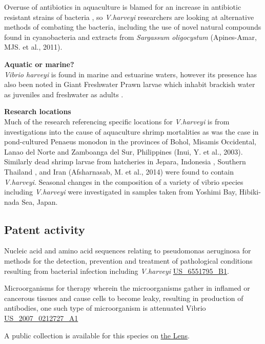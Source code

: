 \documentclass[]{book}
\theoremstyle{definition}
\theoremstyle{definition}
\theoremstyle{definition}
\theoremstyle{remark}
\begin{document}
Overuse of antibiotics in aquaculture is blamed for an increase in
antibiotic resistant strains of bacteria \citep{Elmahdi_2016}, so
\emph{V.harveyi} researchers are looking at alternative methods of
combating the bacteria, including the use of novel natural compounds
found in cyanobacteria \citep{Maneechote_2016} and extracts from
\emph{Sargassum oligocystum} (Apines-Amar, MJS. et al., 2011).

\textbf{Aquatic or marine?}\\
\emph{Vibrio harveyi} is found in marine and estuarine waters, however
its presence has also been noted in Giant Freshwater Prawn larvae which
inhabit brackish water as juveniles and freshwater as adults
\citep{Pande_2013}.

\textbf{Research locations}\\
Much of the research referencing specific locations for \emph{V.harveyi}
is from investigations into the cause of aquaculture shrimp mortalities
as was the case in pond-cultured Penaeus monodon in the provinces of
Bohol, Misamis Occidental, Lanao del Norte and Zamboanga del Sur,
Philippines (Inui, Y. et al., 2003). Similarly dead shrimp larvae from
hatcheries in Jepara, Indonesia \citep{Prayitno_1995}, Southern Thailand
\citep{Ruangpan_1999}, and Iran (Afsharnasab, M. et al., 2014) were
found to contain \emph{V.harveyi}. Seasonal changes in the composition
of a variety of vibrio species including \emph{V.harveyi} were
investigated in samples taken from Yoshimi Bay, Hibiki-nada Sea, Japan.

\hypertarget{patent-activity-8}{%
\subsection{Patent activity}\label{patent-activity-8}}

Nucleic acid and amino acid sequences relating to pseudomonas aeruginosa
for methods for the detection, prevention and treatment of pathological
conditions resulting from bacterial infection including \emph{V.harveyi}
\href{https://www.lens.org/lens/patent/US_6551795_B1}{US\_6551795\_B1}.

Microorganisms for therapy wherein the microorganisms gather in inflamed
or cancerous tissues and cause cells to become leaky, resulting in
production of antibodies, one such type of microorganism is attenuated
Vibrio
\href{https://www.lens.org/lens/patent/US_2007_0212727_A1}{US\_2007\_0212727\_A1}

A public collection is available for this species on
\href{https://www.lens.org/lens/collection/24872}{the Lens}.
\end{document}
